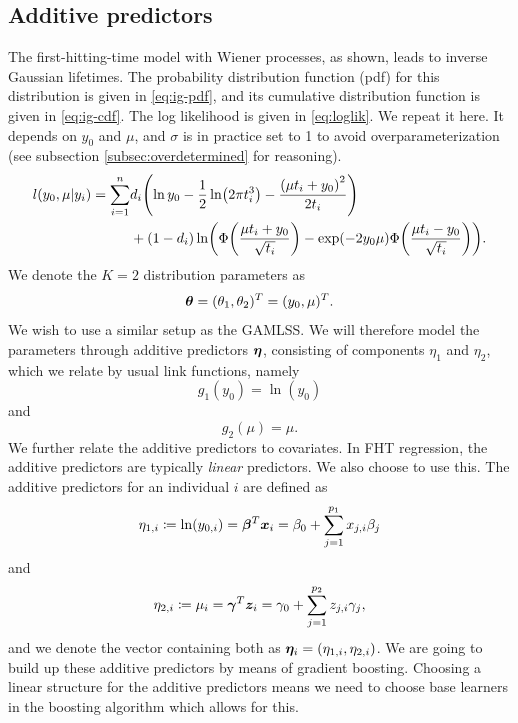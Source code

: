 \subsection{Additive predictors}
The first-hitting-time model with Wiener processes, as shown, leads to inverse Gaussian lifetimes.
The probability distribution function (pdf) for this distribution is given in \eqref{eq:ig-pdf}, and its cumulative distribution function is given in \eqref{eq:ig-cdf}.
The log likelihood is given in \eqref{eq:loglik}.
We repeat it here.
It depends on $y_0$ and $\mu$, and $\sigma$ is in practice set to 1 to avoid overparameterization (see subsection \ref{subsec:overdetermined} for reasoning).
\begin{align*}
\begin{split}
    l(y_0,\mu|y_i)=\sum_{i=1}^n&d_i\p*{\ln y_0-\frac{1}{2}\ln\p*{2\pi\ti^3}-\frac{\p*{\mu\ti+y_0}^2}{2\ti}} \\
    &+
    (1-d_i)\ln\p*{\Phi\p*{\frac{\mu\ti+y_0}{\sqrt{\ti}}}-\exp\p*{-2y_0\mu}\Phi\p*{\frac{\mu\ti-y_0}{\sqrt{\ti}}}}.
\end{split}
\end{align*}
We denote the $K=2$ distribution parameters as
\begin{equation}
    \boldsymbol{\theta}=(\theta_1,\theta_2)^T=(y_0,\mu)^T.
\end{equation}
We wish to use a similar setup as the GAMLSS.
We will therefore model the parameters through additive predictors $\boldsymbol{\eta}$, consisting of components $\eta_1$ and $\eta_2$, which we relate by usual link functions, namely
\begin{equation}
    g_1(y_0)=\ln(y_0)
\end{equation}
and
\begin{equation}
    g_2(\mu)=\mu.
\end{equation}
We further relate the additive predictors to covariates.
In FHT regression, the additive predictors are typically \textit{linear} predictors.
We also choose to use this.
The additive predictors for an individual $i$ are defined as
\begin{equation}\label{eq:eta1}
    \eta_{1,i}\coloneqq \ln(y_{0,i})=\boldsymbol{\beta}^T \bm{x}_i=\beta_{0}+\sum_{j=1}^{p_1}x_{j,i}\beta_j
\end{equation}
and
\begin{equation}\label{eq:eta2}
    \eta_{2,i}\coloneqq \mu_{i}=\boldsymbol{\gamma}^T \bm{z}_i=\gamma_{0}+\sum_{j=1}^{p_2}z_{j,i}\gamma_j,
\end{equation}
and we denote the vector containing both as $\boldsymbol{\eta}_i=\left(\eta_{1,i},\eta_{2,i}\right)$.
We are going to build up these additive predictors by means of gradient boosting.
Choosing a linear structure for the additive predictors means we need to choose base learners in the boosting algorithm which allows for this.

